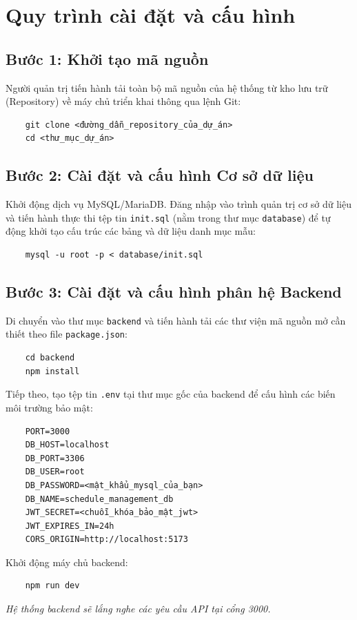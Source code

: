\documentclass[18pt,a4paper]{report}
\begin{document}
\section{Quy trình cài đặt và cấu hình}

\subsection{Bước 1: Khởi tạo mã nguồn}
Người quản trị tiến hành tải toàn bộ mã nguồn của hệ thống từ kho lưu trữ (Repository) về máy chủ triển khai thông qua lệnh Git:
\begin{verbatim}
    git clone <đường_dẫn_repository_của_dự_án>
    cd <thư_mục_dự_án>
\end{verbatim}

\subsection{Bước 2: Cài đặt và cấu hình Cơ sở dữ liệu}
Khởi động dịch vụ MySQL/MariaDB. Đăng nhập vào trình quản trị cơ sở dữ liệu và tiến hành thực thi tệp tin \texttt{init.sql} (nằm trong thư mục \texttt{database}) để tự động khởi tạo cấu trúc các bảng và dữ liệu danh mục mẫu:
\begin{verbatim}
    mysql -u root -p < database/init.sql
\end{verbatim}

\subsection{Bước 3: Cài đặt và cấu hình phân hệ Backend}
Di chuyển vào thư mục \texttt{backend} và tiến hành tải các thư viện mã nguồn mở cần thiết theo file \texttt{package.json}:
\begin{verbatim}
    cd backend
    npm install
\end{verbatim}
Tiếp theo, tạo tệp tin \texttt{.env} tại thư mục gốc của backend để cấu hình các biến môi trường bảo mật:
\begin{verbatim}
    PORT=3000
    DB_HOST=localhost
    DB_PORT=3306
    DB_USER=root
    DB_PASSWORD=<mật_khẩu_mysql_của_bạn>
    DB_NAME=schedule_management_db
    JWT_SECRET=<chuỗi_khóa_bảo_mật_jwt>
    JWT_EXPIRES_IN=24h
    CORS_ORIGIN=http://localhost:5173
\end{verbatim}
Khởi động máy chủ backend:
\begin{verbatim}
    npm run dev
\end{verbatim}
\textit{Hệ thống backend sẽ lắng nghe các yêu cầu API tại cổng 3000.}
\end{document}
